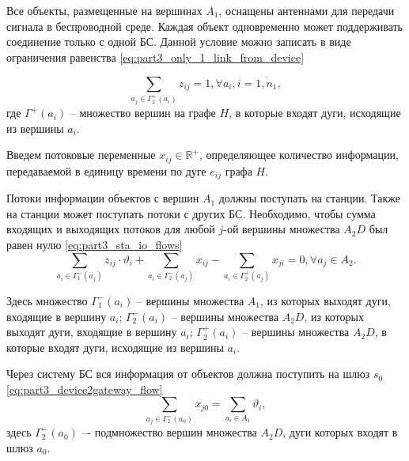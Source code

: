 Все объекты, размещенные на вершинах $A_1$, оснащены антеннами для передачи сигнала в беспроводной среде. Каждая объект одновременно может поддерживать соединение только с одной БС. Данной условие можно записать в виде ограничения равенства \cref{eq:part3_only_1_link_from_device}


\begin{equation}\label{eq:part3_only_1_link_from_device}
    \sum_{a_j \in \Gamma_2^+(a_i)} z_{ij} = 1, \forall a_i, i =\overline{1, n_1},
\end{equation} 
где $\Gamma^+(a_i)$ -- множество вершин на графе $H$, в которые входят дуги, исходящие из вершины $a_i$.

Введем потоковые переменные $x_{ij} \in \mathbb{R}^+$, определяющее количество информации, передаваемой в единицу времени по дуге $e_{ij}$ графа $H$.

Потоки информации объектов с вершин $A_1$ должны поступать на станции. Также на станции может поступать потоки с других БС. Необходимо, чтобы сумма входящих и выходящих потоков для любой $j$-ой вершины множества $A_2D$ был равен нулю \cref{eq:part3_sta_io_flows} 
\begin{equation}\label{eq:part3_sta_io_flows} 
    \sum_{a_i \in \Gamma_1^-(a_j)} z_{ij} \cdot \vartheta_i + \sum_{a_i \in \Gamma_2^-(a_j)} x_{ij} -  \sum_{a_i \in \Gamma_2^+(a_j)} x_{ji} =0 ,\forall a_j \in A_2. 
\end{equation} 


Здесь множество $\Gamma_1^-(a_i)$ -- вершины множества $A_1$, из которых выходят дуги, входящие в вершину $a_i$; $\Gamma_2^-(a_i)$ -- вершины множества $A_2D$, из которых выходят дуги, входящие в  вершину $a_i$; $\Gamma_2^+(a_i)$ -- вершины множества $A_2D$, в которые входят дуги, исходящие из вершины  $a_i$.

Через систему БС вся информация от объектов  должна поступить на шлюз $s_0$ \cref{eq:part3_device2gateway_flow} 
\begin{equation}\label{eq:part3_device2gateway_flow}
    \sum_{a_j \in \Gamma_2^-(a_0)} x_{j0} = \sum_{a_i \in A_1} \vartheta_i,
\end{equation}
здесь $\Gamma_2^-(a_0)$ –- подмножество вершин множества $A_2D$, дуги которых входят в шлюз $a_0$.

